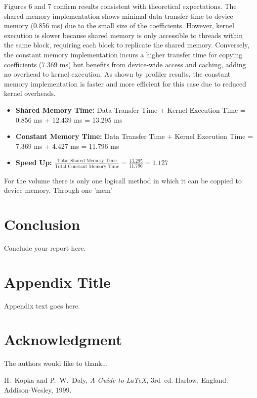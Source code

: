 \documentclass[journal,11pt]{IEEEtran}
\begin{document}
Figures 6 and 7 confirm results consistent with theoretical expectations. The shared memory implementation shows minimal data transfer time to device memory (0.856 ms) due to the small size of the coefficients. However, kernel execution is slower because shared memory is only accessible to threads within the same block, requiring each block to replicate the shared memory. Conversely, the constant memory implementation incurs a higher transfer time for copying coefficients (7.369 ms) but benefits from device-wide access and caching, adding no overhead to kernel execution. As shown by profiler results, the constant memory implementation is faster and more efficient for this case due to reduced kernel overheads.

\begin{itemize}
    \item \textbf{Shared Memory Time:} Data Transfer Time + Kernel Execution Time = 0.856 ms + 12.439 ms = 13.295 ms
    \item \textbf{Constant Memory Time:} Data Transfer Time + Kernel Execution Time = 7.369 ms + 4.427 ms = 11.796 ms
    \item \textbf{Speed Up:} $\frac{\text{Total Shared Memory Time}}{\text{Total Constant Memory Time}} = \frac{13.295}{11.796} = 1.127$
\end{itemize}

For the volume there is only one logicall method in which it can be coppied to device memory. Through one 'mem'



\section{Conclusion}
Conclude your report here.

\appendices
\section{Appendix Title}
Appendix text goes here.

\section*{Acknowledgment}
The authors would like to thank...

\begin{thebibliography}{1}

H.~Kopka and P.~W.~Daly, \emph{A Guide to \LaTeX}, 3rd~ed. Harlow, England: Addison-Wesley, 1999.

\end{thebibliography}
\end{document}
